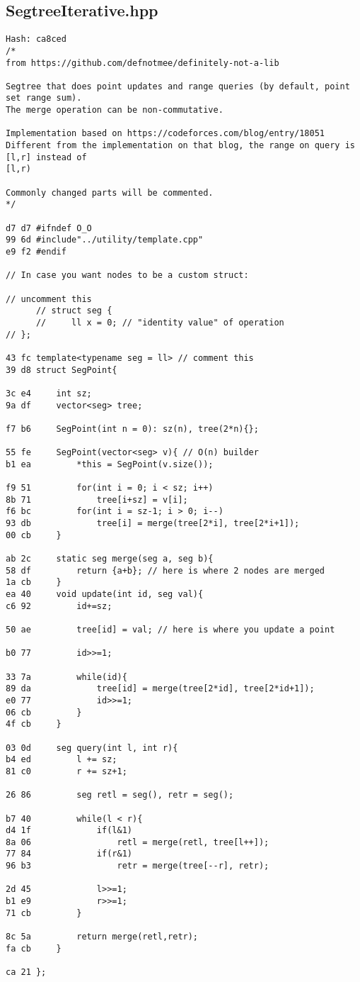 \documentclass[11pt, a4paper, twoside]{article}
\begin{document}
\subsection{SegtreeIterative.hpp}
\begin{lstlisting}
Hash: ca8ced
/*
from https://github.com/defnotmee/definitely-not-a-lib

Segtree that does point updates and range queries (by default, point set range sum). 
The merge operation can be non-commutative. 

Implementation based on https://codeforces.com/blog/entry/18051
Different from the implementation on that blog, the range on query is [l,r] instead of
[l,r)

Commonly changed parts will be commented.
*/

d7 d7 #ifndef O_O
99 6d #include"../utility/template.cpp"
e9 f2 #endif

// In case you want nodes to be a custom struct:

// uncomment this
      // struct seg {
      //     ll x = 0; // "identity value" of operation
// };

43 fc template<typename seg = ll> // comment this
39 d8 struct SegPoint{
      
3c e4     int sz;
9a df     vector<seg> tree;
      
f7 b6     SegPoint(int n = 0): sz(n), tree(2*n){};
      
55 fe     SegPoint(vector<seg> v){ // O(n) builder
b1 ea         *this = SegPoint(v.size());
      
f9 51         for(int i = 0; i < sz; i++)
8b 71             tree[i+sz] = v[i];
f6 bc         for(int i = sz-1; i > 0; i--)
93 db             tree[i] = merge(tree[2*i], tree[2*i+1]);
00 cb     }
      
ab 2c     static seg merge(seg a, seg b){ 
58 df         return {a+b}; // here is where 2 nodes are merged
1a cb     }
ea 40     void update(int id, seg val){
c6 92         id+=sz;
      
50 ae         tree[id] = val; // here is where you update a point
      
b0 77         id>>=1;
      
33 7a         while(id){
89 da             tree[id] = merge(tree[2*id], tree[2*id+1]);
e0 77             id>>=1;
06 cb         }
4f cb     }
      
03 0d     seg query(int l, int r){
b4 ed         l += sz;
81 c0         r += sz+1;
              
26 86         seg retl = seg(), retr = seg();
      
b7 40         while(l < r){
d4 1f             if(l&1)
8a 06                 retl = merge(retl, tree[l++]);
77 84             if(r&1)
96 b3                 retr = merge(tree[--r], retr);
      
2d 45             l>>=1;
b1 e9             r>>=1;
71 cb         }
      
8c 5a         return merge(retl,retr);
fa cb     }
      
ca 21 };
\end{lstlisting}
\end{document}
